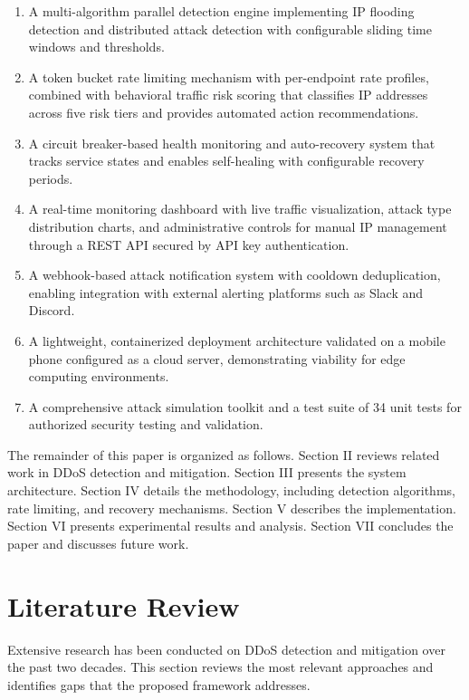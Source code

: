 \documentclass[conference]{IEEEtran}
\begin{document}
\begin{enumerate}
\item A multi-algorithm parallel detection engine implementing IP flooding detection and distributed attack detection with configurable sliding time windows and thresholds.
\item A token bucket rate limiting mechanism with per-endpoint rate profiles, combined with behavioral traffic risk scoring that classifies IP addresses across five risk tiers and provides automated action recommendations.
\item A circuit breaker-based health monitoring and auto-recovery system that tracks service states and enables self-healing with configurable recovery periods.
\item A real-time monitoring dashboard with live traffic visualization, attack type distribution charts, and administrative controls for manual IP management through a REST API secured by API key authentication.
\item A webhook-based attack notification system with cooldown deduplication, enabling integration with external alerting platforms such as Slack and Discord.
\item A lightweight, containerized deployment architecture validated on a mobile phone configured as a cloud server, demonstrating viability for edge computing environments.
\item A comprehensive attack simulation toolkit and a test suite of 34 unit tests for authorized security testing and validation.
\end{enumerate}

The remainder of this paper is organized as follows. Section II reviews related work in DDoS detection and mitigation. Section III presents the system architecture. Section IV details the methodology, including detection algorithms, rate limiting, and recovery mechanisms. Section V describes the implementation. Section VI presents experimental results and analysis. Section VII concludes the paper and discusses future work.

\section{Literature Review}

Extensive research has been conducted on DDoS detection and mitigation over the past two decades. This section reviews the most relevant approaches and identifies gaps that the proposed framework addresses.
\end{document}
